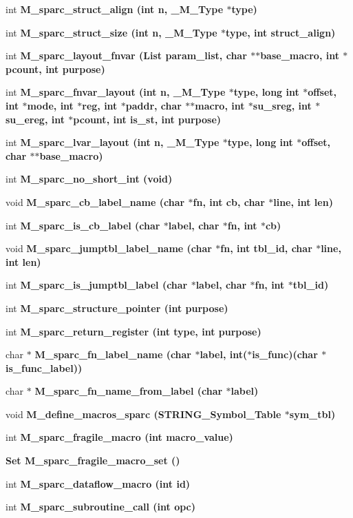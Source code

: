 \begin{CompactItemize}
int \bf{M\_\-sparc\_\-struct\_\-align} (int n, \bf{\_\-M\_\-Type} $\ast$type)
\item 
int \bf{M\_\-sparc\_\-struct\_\-size} (int n, \bf{\_\-M\_\-Type} $\ast$type, int struct\_\-align)
\item 
int \bf{M\_\-sparc\_\-layout\_\-fnvar} (\bf{List} param\_\-list, char $\ast$$\ast$base\_\-macro, int $\ast$pcount, int purpose)
\item 
int \bf{M\_\-sparc\_\-fnvar\_\-layout} (int n, \bf{\_\-M\_\-Type} $\ast$type, long int $\ast$offset, int $\ast$\bf{mode}, int $\ast$reg, int $\ast$paddr, char $\ast$$\ast$macro, int $\ast$su\_\-sreg, int $\ast$su\_\-ereg, int $\ast$pcount, int is\_\-st, int purpose)
\item 
int \bf{M\_\-sparc\_\-lvar\_\-layout} (int n, \bf{\_\-M\_\-Type} $\ast$type, long int $\ast$offset, char $\ast$$\ast$base\_\-macro)
\item 
int \bf{M\_\-sparc\_\-no\_\-short\_\-int} (void)
\item 
void \bf{M\_\-sparc\_\-cb\_\-label\_\-name} (char $\ast$fn, int cb, char $\ast$line, int len)
\item 
int \bf{M\_\-sparc\_\-is\_\-cb\_\-label} (char $\ast$label, char $\ast$fn, int $\ast$cb)
\item 
void \bf{M\_\-sparc\_\-jumptbl\_\-label\_\-name} (char $\ast$fn, int tbl\_\-id, char $\ast$line, int len)
\item 
int \bf{M\_\-sparc\_\-is\_\-jumptbl\_\-label} (char $\ast$label, char $\ast$fn, int $\ast$tbl\_\-id)
\item 
int \bf{M\_\-sparc\_\-structure\_\-pointer} (int purpose)
\item 
int \bf{M\_\-sparc\_\-return\_\-register} (int type, int purpose)
\item 
char $\ast$ \bf{M\_\-sparc\_\-fn\_\-label\_\-name} (char $\ast$label, int($\ast$is\_\-func)(char $\ast$is\_\-func\_\-label))
\item 
char $\ast$ \bf{M\_\-sparc\_\-fn\_\-name\_\-from\_\-label} (char $\ast$label)
\item 
void \bf{M\_\-define\_\-macros\_\-sparc} (\bf{STRING\_\-Symbol\_\-Table} $\ast$sym\_\-tbl)
\item 
int \bf{M\_\-sparc\_\-fragile\_\-macro} (int macro\_\-value)
\item 
\bf{Set} \bf{M\_\-sparc\_\-fragile\_\-macro\_\-set} ()
\item 
int \bf{M\_\-sparc\_\-dataflow\_\-macro} (int id)
\item 
int \bf{M\_\-sparc\_\-subroutine\_\-call} (int opc)
$$
\end{CompactItemize}
